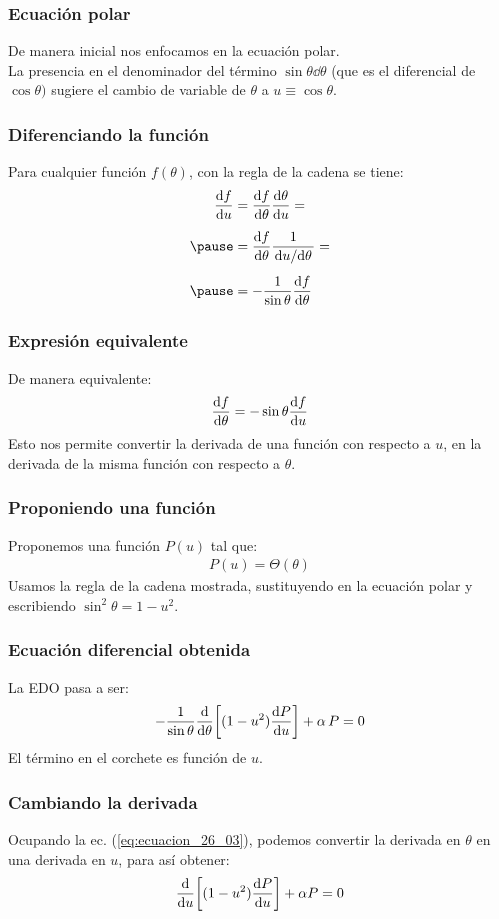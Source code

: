 \documentclass[12pt]{beamer}
\begin{document}
\begin{frame}
\frametitle{Ecuación polar}
De manera inicial nos enfocamos en la ecuación polar.
\\
\bigskip
\pause
La presencia en el denominador del término $\sin \theta \dd{\theta}$ (que es el diferencial de $\cos \theta)$ sugiere el cambio de variable de $\theta$ a $u \equiv \cos \theta$.
\end{frame}
\begin{frame}
\frametitle{Diferenciando la función}
Para cualquier función $f (\theta)$, con la regla de la cadena se tiene:
\pause
\begin{eqnarray*}
\begin{aligned}
\dv{f}{u} &= \dv{f}{\theta} \dv{\theta}{u} = \\[0.5em] \pause
&= \dv{f}{\theta} \dfrac{1}{\dv*{u}{\theta}} = \\[0.5em] \pause
&= - \dfrac{1}{\sin \theta} \dv{f}{\theta}
\end{aligned}
\end{eqnarray*}
\end{frame}
\begin{frame}
\frametitle{Expresión equivalente}
De manera equivalente:
\pause
\begin{align}
\dv{f}{\theta} = - \sin \theta \dv{f}{u}
\label{eq:ecuacion_26_03}
\end{align}
\pause
Esto nos permite convertir la derivada de una función con respecto a $u$, en la derivada de la misma función con respecto a $\theta$.
\end{frame}
\begin{frame}
\frametitle{Proponiendo una función}
Proponemos una función $P(u)$ tal que:
\pause
\begin{align*}
P (u) = \Theta(\theta)
\end{align*}
Usamos la regla de la cadena mostrada, sustituyendo en la ecuación polar y escribiendo $\sin^{2} \theta = 1 - u^{2}$.
\end{frame}
\begin{frame}
\frametitle{Ecuación diferencial obtenida}
La EDO pasa a ser:
\pause
\begin{align*}
- \dfrac{1}{\sin \theta} \dv{\theta} \bigg[ (1 - u^{2}) \dv{P}{u} \bigg] + \alpha \, P = 0
\end{align*}
El término en el corchete es función de $u$.
\end{frame}
\begin{frame}
\frametitle{Cambiando la derivada}
Ocupando la ec. (\ref{eq:ecuacion_26_03}), podemos convertir la derivada en $\theta$ en una derivada en $u$, para así obtener:
\pause
\begin{align}
\dv{u} \bigg[ (1 - u^{2}) \dv{P}{u} \bigg] + \alpha P = 0
\label{eq:ecuacion_26_04}
\end{align}
\end{frame}
\end{document}
